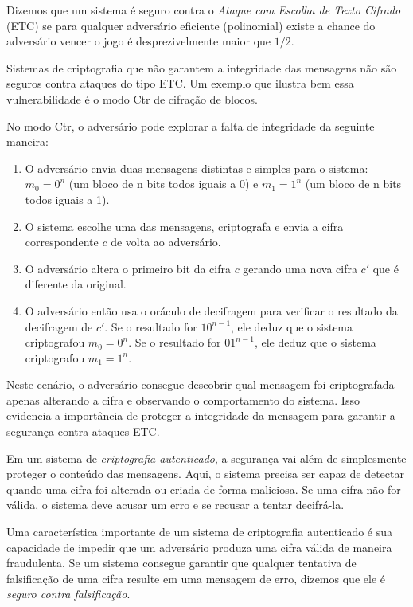 Dizemos que um sistema é seguro contra o {\em Ataque com Escolha de Texto Cifrado} (ETC) se para qualquer adversário eficiente (polinomial) existe a chance do adversário vencer o jogo é desprezivelmente maior que $1/2$.

Sistemas de criptografia que não garantem a integridade das mensagens não são seguros contra ataques do tipo ETC.
Um exemplo que ilustra bem essa vulnerabilidade é o modo Ctr de cifração de blocos.

\begin{example}
No modo Ctr, o adversário pode explorar a falta de integridade da seguinte maneira:
\begin{enumerate}
\item  O adversário  envia duas mensagens distintas e simples para o sistema: 
$m_0 = 0^n$ (um bloco de n bits todos iguais a 0) e $m_1 = 1^n$ (um bloco de n bits todos iguais a 1).
\item O sistema escolhe uma das mensagens, criptografa e envia a cifra correspondente $c$ de volta ao adversário.
\item O adversário altera o primeiro bit da cifra $c$ gerando uma nova cifra $c'$ que é diferente da original.
\item O adversário então usa o oráculo de decifragem para verificar o resultado da decifragem de $c'$.
  Se o resultado for $10^{n-1}$, ele deduz que o sistema criptografou $m_0 = 0^n$.
  Se o resultado for $01^{n-1}$, ele deduz que o sistema criptografou $m_1 = 1^n$.
\end{enumerate}

Neste cenário, o adversário consegue descobrir qual mensagem foi criptografada apenas alterando a cifra e observando o comportamento do sistema.
Isso evidencia a importância de proteger a integridade da mensagem para garantir a segurança contra ataques ETC.
\end{example}


Em um sistema de {\em criptografia autenticado}, a segurança vai além de simplesmente proteger o conteúdo das mensagens.
Aqui, o sistema precisa ser capaz de detectar quando uma cifra foi alterada ou criada de forma maliciosa.
Se uma cifra não for válida, o sistema deve acusar um erro e se recusar a tentar decifrá-la.

Uma característica importante de um sistema de criptografia autenticado é sua capacidade de impedir que um adversário produza uma cifra válida de maneira fraudulenta.
Se um sistema consegue garantir que qualquer tentativa de falsificação de uma cifra resulte em uma mensagem de erro, dizemos que ele é {\em seguro contra falsificação}.

